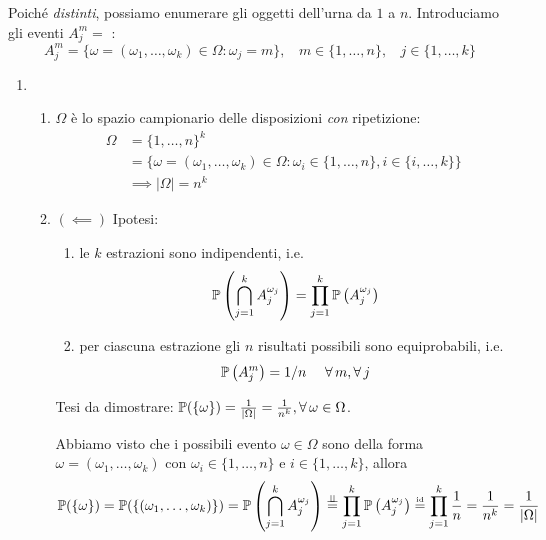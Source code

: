 Poiché \textit{distinti}, possiamo enumerare gli oggetti dell'urna da $1$ a $n$. Introduciamo gli eventi $A_{j}^{m} =$ :
\begin{equation*}
	A_{j}^{m} =\{\omega =(\omega_{1} ,\dots ,\omega_{k}) \in \Omega :\omega_{j} =m\} ,\ \ \ \ m\in \{1,\dots,n\} ,\ \ \ \ j\in \{1,\dots,k\}
\end{equation*}
\begin{enumerate}
	\item 
	\begin{enumerate}
		\item $\Omega $ è lo spazio campionario delle disposizioni \textit{con} ripetizione:
		\begin{align*}
			\Omega  & =\{1,\dots,n\}^{k}\\
			 & =\{\omega =(\omega_{1} ,\dots ,\omega_{k}) \in \Omega :\omega_{i} \in \{1,\dots,n\} ,i\in \{i,\dots,k\}\}\\
			 & \implies |\Omega| =n^{k}
		\end{align*}
		\item $(\impliedby)$ Ipotesi:
		\begin{enumerate}
			\item le $k$ estrazioni sono indipendenti, i.e.
			\begin{equation*}
				\mathbb{P}\left(\bigcap_{j=1}^{k} A_{j}^{\omega_{j}}\right) =\prod_{j=1}^{k}\mathbb{P}\left(A_{j}^{\omega_{j}}\right)
			\end{equation*}
			\item per ciascuna estrazione gli $n$ risultati possibili sono equiprobabili, i.e.
			\begin{equation*}
				\PP\left(A_{j}^{m}\right) =1/n\ \ \ \ \forall m,\forall j
			\end{equation*}
		\end{enumerate}
		Tesi da dimostrare: $\PP(\{\omega \}) =\frac{1}{|\Omega| } =\frac{1}{n^{k}} ,\forall \omega \in \Omega $.

		Abbiamo visto che i possibili evento $\omega \in \Omega $ sono della forma $\omega =(\omega_{1} ,\dots ,\omega_{k})$ con $\omega_{i} \in \{1,\dots,n\}$ e $i\in \{1,\dots,k\}$, allora
		\begin{align*}
			\mathbb{P}(\{\omega \}) & =\mathbb{P}(\{(\omega_{1} ,\dots ,\omega_{k})\}) = \mathbb{P}\left(\bigcap_{j=1}^{k} A_{j}^{\omega_{j}}\right) \overset{\perp \!\!\! \perp}{=} \prod_{j=1}^{k}\mathbb{P}\left(A_{j}^{\omega_{j}}\right) \overset{\text{\tiny id}}{=} \prod_{j=1}^{k}\frac{1}{n} =\frac{1}{n^{k}} =\frac{1}{|\Omega| }
		\end{align*}


\end{enumerate}
\end{enumerate}
